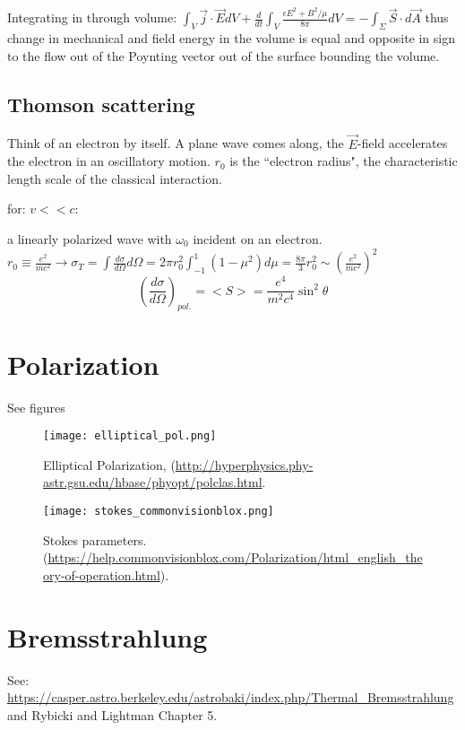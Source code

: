 \documentclass[12pt]{report}
\begin{document}
 Integrating in through volume: 
 $ \int_V \vec{j}\cdot\vec{E} dV +\frac{d}{dt}\int_V\frac{\epsilon E^2 +B^2/\mu}{8\pi}dV=-\int_\Sigma \vec{S}\cdot d\vec{A} $ 
 thus change in mechanical and field energy in the volume is equal and opposite in sign to the flow out of the Poynting vector out of the surface bounding the volume. \\
 
 \subsection{Thomson scattering}
  Think of an electron by itself. A plane wave comes along, the $\vec{E}$-field accelerates the electron in an oscillatory motion.  $r_0$ is the ``electron radius",  the characteristic length scale of the classical interaction.
  
 for: \( v<<c\):
 
 a linearly polarized wave with $\omega_0$ incident on an electron.\\
 \(r_0\equiv \frac{e^2}{mc^2}\rightarrow \sigma_T=\int\frac{d\sigma}{d\Omega}d\Omega= 2\pi r_0^2 \int_{-1}^1(1-\mu^2)d\mu=\frac{8\pi}{3}r_0^2 \sim (\frac{e^2}{mc^2})^2\)\\
 
 \[(\frac{d\sigma}{d\Omega})_{pol.}=<S>=\frac{e^4}{m^2c^4}\sin^2\theta\]
 
 \newpage
\section{Polarization}
See figures
\begin{figure}[h]
\begin{center}
\texttt{[image: elliptical\_pol.png]}
\caption{Elliptical Polarization, (\url{http://hyperphysics.phy-astr.gsu.edu/hbase/phyopt/polclas.html}.}
\texttt{[image: stokes\_commonvisionblox.png]}
\caption{Stokes parameters. (\url{https://help.commonvisionblox.com/Polarization/html_english_theory-of-operation.html}).}
\label{default}
\end{center}
\end{figure}


\section{Bremsstrahlung}

See: \url{https://casper.astro.berkeley.edu/astrobaki/index.php/Thermal_Bremsstrahlung} and Rybicki and Lightman Chapter 5. 
\end{document}
